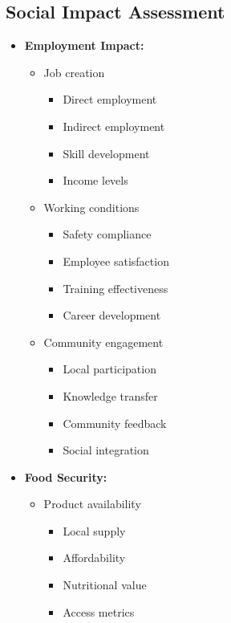 \subsection{Social Impact Assessment}
\begin{itemize}
    \item \textbf{Employment Impact:}
    \begin{itemize}
        \item Job creation
        \begin{itemize}
            \item Direct employment
            \item Indirect employment
            \item Skill development
            \item Income levels
        \end{itemize}
        
        \item Working conditions
        \begin{itemize}
            \item Safety compliance
            \item Employee satisfaction
            \item Training effectiveness
            \item Career development
        \end{itemize}
        
        \item Community engagement
        \begin{itemize}
            \item Local participation
            \item Knowledge transfer
            \item Community feedback
            \item Social integration
        \end{itemize}
    \end{itemize}
    
    \item \textbf{Food Security:}
    \begin{itemize}
        \item Product availability
        \begin{itemize}
            \item Local supply
            \item Affordability
            \item Nutritional value
            \item Access metrics
        \end{itemize}
        

\end{itemize}
\end{itemize}
